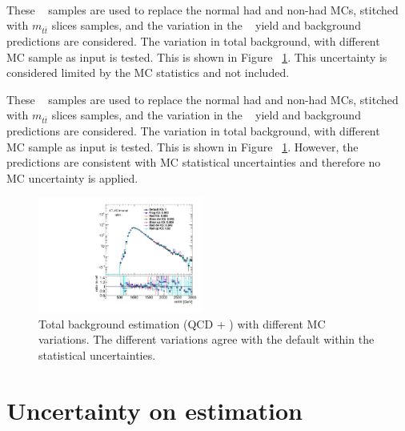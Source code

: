 \paragraph{}
These \ttbar~ samples are used to replace the normal had and non-had MCs, stitched with $m_{t\bar{t}}$ slices samples, and the variation in the \ttbar~ yield and background predictions are considered. 
The variation in total background, with different \ttbar~ MC sample as input is tested. 
This is shown in Figure ~\ref{fig:ttbar-MC}. 
This uncertainty is considered limited by the MC statistics and not included.

These \ttbar~ samples are used to replace the normal had and non-had MCs, stitched with $m_{t\bar{t}}$ slices samples, and the variation in the \ttbar~ yield and background predictions are considered. 
The variation in total background, with different \ttbar~ MC sample as input is tested. 
This is shown in Figure ~\ref{fig:ttbar-MC}. 
However, the predictions are consistent with MC statistical uncertainties and therefore no \ttbar~ MC uncertainty is applied.

\begin{figure}[htb!]
\begin{center} 
\includegraphics[width=0.48\textwidth,angle=-90]{figures/boosted/Other/directcompare_mHH_l_1_TwoTag_split_Top_syst_stat_postfit_all_.pdf}
\caption{Total background estimation (QCD + \ttbar) with different \ttbar MC variations. The different variations agree with the default within the statistical uncertainties.}
\label{fig:ttbar-MC}
\end{center}
\end{figure}



\section{Uncertainty on \muqcd estimation}
\label{sec:non-closure-mu-qcd}

